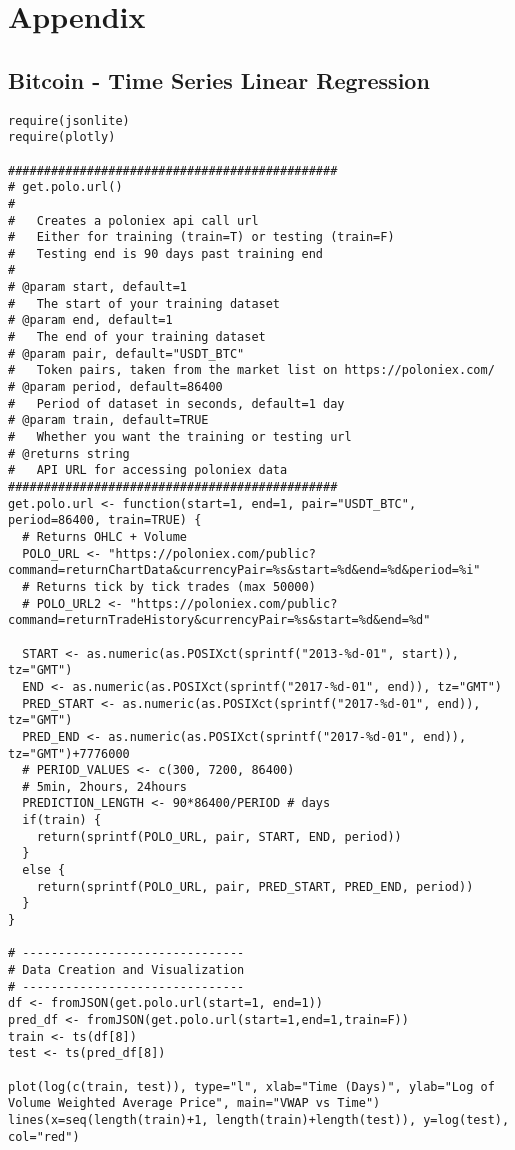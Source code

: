 \section {Appendix}
\subsection{Bitcoin - Time Series Linear Regression}
\begin{verbatim}
require(jsonlite)
require(plotly)

##############################################
# get.polo.url()
#
#   Creates a poloniex api call url
#   Either for training (train=T) or testing (train=F)
#   Testing end is 90 days past training end
#
# @param start, default=1
#   The start of your training dataset
# @param end, default=1
#   The end of your training dataset
# @param pair, default="USDT_BTC"
#   Token pairs, taken from the market list on https://poloniex.com/
# @param period, default=86400
#   Period of dataset in seconds, default=1 day
# @param train, default=TRUE
#   Whether you want the training or testing url
# @returns string
#   API URL for accessing poloniex data
##############################################
get.polo.url <- function(start=1, end=1, pair="USDT_BTC", period=86400, train=TRUE) {
  # Returns OHLC + Volume
  POLO_URL <- "https://poloniex.com/public?command=returnChartData&currencyPair=%s&start=%d&end=%d&period=%i"
  # Returns tick by tick trades (max 50000)
  # POLO_URL2 <- "https://poloniex.com/public?command=returnTradeHistory&currencyPair=%s&start=%d&end=%d"

  START <- as.numeric(as.POSIXct(sprintf("2013-%d-01", start)), tz="GMT")
  END <- as.numeric(as.POSIXct(sprintf("2017-%d-01", end)), tz="GMT")
  PRED_START <- as.numeric(as.POSIXct(sprintf("2017-%d-01", end)), tz="GMT")
  PRED_END <- as.numeric(as.POSIXct(sprintf("2017-%d-01", end)), tz="GMT")+7776000
  # PERIOD_VALUES <- c(300, 7200, 86400)
  # 5min, 2hours, 24hours
  PREDICTION_LENGTH <- 90*86400/PERIOD # days
  if(train) {
    return(sprintf(POLO_URL, pair, START, END, period))
  }
  else {
    return(sprintf(POLO_URL, pair, PRED_START, PRED_END, period))
  }
}

# -------------------------------
# Data Creation and Visualization
# -------------------------------
df <- fromJSON(get.polo.url(start=1, end=1))
pred_df <- fromJSON(get.polo.url(start=1,end=1,train=F))
train <- ts(df[8])
test <- ts(pred_df[8])

plot(log(c(train, test)), type="l", xlab="Time (Days)", ylab="Log of Volume Weighted Average Price", main="VWAP vs Time")
lines(x=seq(length(train)+1, length(train)+length(test)), y=log(test), col="red")


\end{verbatim}
